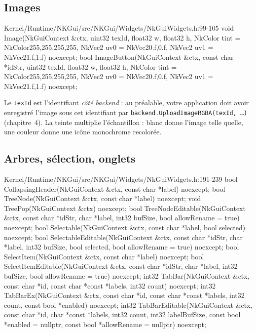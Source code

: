 \subsection{Images}

\begin{nkcode}{Kernel/Runtime/NKGui/src/NKGui/Widgets/NkGuiWidgets.h:99-105}
void Image(NkGuiContext &ctx, uint32 texId, float32 w, float32 h,
           NkColor tint = NkColor{255,255,255,255},
           NkVec2 uv0 = NkVec2{0.f,0.f}, NkVec2 uv1 = NkVec2{1.f,1.f}) noexcept;
bool ImageButton(NkGuiContext &ctx, const char *idStr, uint32 texId, float32 w, float32 h,
                 NkColor tint = NkColor{255,255,255,255},
                 NkVec2 uv0 = NkVec2{0.f,0.f}, NkVec2 uv1 = NkVec2{1.f,1.f}) noexcept;
\end{nkcode}

Le \texttt{texId} est l'identifiant \emph{côté backend} : au préalable, votre
application doit avoir enregistré l'image sous cet identifiant par
\texttt{backend.UploadImageRGBA(texId, \dots)} (chapitre~4). La teinte multiplie l'échantillon : blanc donne l'image telle
quelle, une couleur donne une icône monochrome recolorée.

\subsection{Arbres, sélection, onglets}

\begin{nkcode}{Kernel/Runtime/NKGui/src/NKGui/Widgets/NkGuiWidgets.h:191-239}
bool CollapsingHeader(NkGuiContext &ctx, const char *label) noexcept;
bool TreeNode(NkGuiContext &ctx, const char *label) noexcept;
void TreePop(NkGuiContext &ctx) noexcept;
bool TreeNodeEditable(NkGuiContext &ctx, const char *idStr, char *label, int32 bufSize,
                      bool allowRename = true) noexcept;
bool Selectable(NkGuiContext &ctx, const char *label, bool selected) noexcept;
bool SelectableEditable(NkGuiContext &ctx, const char *idStr, char *label, int32 bufSize,
                        bool selected, bool allowRename = true) noexcept;
bool SelectItem(NkGuiContext &ctx, const char *label) noexcept;
bool SelectItemEditable(NkGuiContext &ctx, const char *idStr, char *label, int32 bufSize,
                        bool allowRename = true) noexcept;
int32 TabBar(NkGuiContext &ctx, const char *id, const char *const *labels, int32 count) noexcept;
int32 TabBarEx(NkGuiContext &ctx, const char *id, const char *const *labels, int32 count,
               const bool *enabled) noexcept;
int32 TabBarEditable(NkGuiContext &ctx, const char *id, char *const *labels, int32 count,
                     int32 labelBufSize, const bool *enabled = nullptr,
                     const bool *allowRename = nullptr) noexcept;
\end{nkcode}

